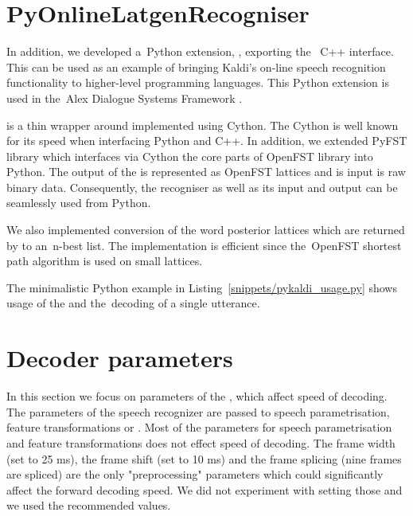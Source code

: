 \section{PyOnlineLatgenRecogniser}
\label{sec:pyext}

In addition, we developed a~Python extension, , exporting the~ C++ interface.
This can be used as an example of bringing Kaldi's on-line speech recognition functionality to higher-level programming languages.
This Python extension is used in the~Alex Dialogue Systems Framework \cite{asdf2014url}.

 is a thin wrapper around  implemented using Cython\cite{cython2014url}.
The Cython is well known for its speed when interfacing Python and C++.
In addition, we extended PyFST library\cite{pyfst2014url} which interfaces via Cython the core parts of OpenFST library into Python.
The output of the  is represented as OpenFST lattices and is input is raw binary data.
Consequently, the recogniser as well as its input and output can be seamlessly used from Python.

We also implemented conversion of the word posterior lattices which are returned by  to an~n-best list. 
The implementation is efficient since the~OpenFST shortest path algorithm is used on small lattices.

The minimalistic Python example in Listing~\ref{snippets/pykaldi_usage.py} shows usage of the  and the~decoding of a single utterance.


\section{Decoder parameters}
\label{sec:real-setup}

In this section we focus on parameters of the ,
which affect speed of decoding.
The parameters of the speech recognizer are passed to speech parametrisation, feature transformations or .
Most of the parameters for speech parametrisation and feature transformations does not effect speed of decoding. 
The frame width (set to 25 ms), the frame shift (set to 10 ms) and the frame splicing (nine frames are spliced) are the only "preprocessing" parameters which could significantly affect the forward decoding speed.
We did not experiment with setting those and we used the recommended values.

